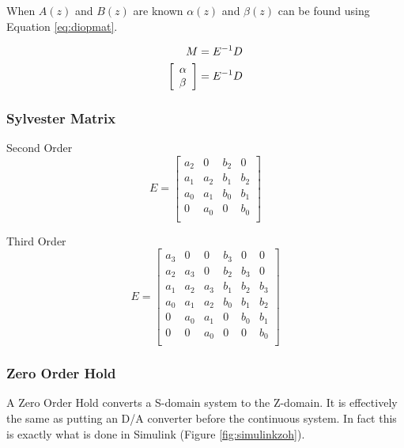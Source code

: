 \documentclass{article}
\begin{document}
When $A(z)$ and $B(z)$ are known $\alpha(z)$ and $\beta(z)$
can be found using Equation \ref{eq:diopmat}.

\begin{align}
	M &= E^{-1} D \label{eq:diopmat} \\
	\left[
	\begin{array}{l}
		\alpha \\
		\beta
	\end{array}
	\right] &= E^{-1} D \notag
\end{align}

\subsubsection{Sylvester Matrix}
\label{sec:sylvester}

Second Order
\[
E=
\begin{bmatrix}
	a_2 & 0 & b_2 & 0 \\
	a_1 & a_2 & b_1 & b_2 \\
	a_0 & a_1 & b_0 & b_1 \\
	0 & a_0 & 0 & b_0 \\
\end{bmatrix}
\]

Third Order
\[
E=
\begin{bmatrix}
	a_3 & 0 & 0 & b_3 & 0 & 0 \\
	a_2 & a_3 & 0 & b_2 & b_3 & 0 \\
	a_1 & a_2 & a_3 & b_1 & b_2 & b_3 \\
	a_0 & a_1 & a_2 & b_0 & b_1 & b_2 \\
	0 & a_0 & a_1 & 0 & b_0 & b_1 \\
	0 & 0 & a_0 & 0 & 0 & b_0 \\
\end{bmatrix}
\]


\subsubsection{Zero Order Hold}

A Zero Order Hold converts a S-domain system to the Z-domain.
It is effectively the same as putting an D/A converter before
the continuous system.
In fact this is exactly what is done in Simulink (Figure \ref{fig:simulinkzoh}).
\end{document}
